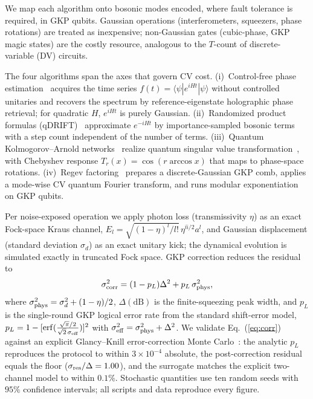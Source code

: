 \documentclass[10pt]{iopart}
\begin{document}
We map each algorithm onto bosonic modes encoded, where fault tolerance is
required, in GKP qubits. Gaussian operations (interferometers, squeezers, phase
rotations) are treated as inexpensive; non-Gaussian gates (cubic-phase, GKP
magic states) are the costly resource, analogous to the $T$-count of
discrete-variable (DV) circuits.

The four algorithms span the axes that govern CV cost. (i)~Control-free phase
estimation~\cite{Clinton2026} acquires the time series
$f(t)=\langle\psi|e^{iHt}|\psi\rangle$ without controlled unitaries and recovers
the spectrum by reference-eigenstate holographic phase retrieval; for quadratic
$H$, $e^{iHt}$ is purely Gaussian. (ii)~Randomized product formulas
(qDRIFT)~\cite{Campbell2019,Chen2021} approximate $e^{-iHt}$ by
importance-sampled bosonic terms with a step count independent of the number of
terms. (iii)~Quantum Kolmogorov--Arnold
networks~\cite{Ivashkov2024,Liu2024} realize quantum singular value
transformation~\cite{Low2017,Gilyen2019,Rossi2022}, with Chebyshev response
$T_r(x)=\cos(r\arccos x)$ that maps to phase-space rotations. (iv)~Regev factoring~\cite{Regev2023,Shor1997}
prepares a discrete-Gaussian GKP comb, applies a mode-wise CV quantum Fourier
transform, and runs modular exponentiation on GKP qubits.

Per noise-exposed operation we apply photon loss (transmissivity $\eta$) as an
exact Fock-space Kraus channel,
$E_l=\sqrt{(1-\eta)^l/l!}\,\eta^{\hat n/2}a^l$, and Gaussian displacement
(standard deviation $\sigma_d$) as an exact unitary kick; the dynamical
evolution is simulated exactly in truncated Fock space. GKP correction reduces
the residual to
\begin{equation}
\sigma_{\rm corr}^2=(1-p_L)\Delta^2+p_L\,\sigma_{\rm phys}^2,
\label{eq:corr}
\end{equation}
where $\sigma_{\rm phys}^2=\sigma_d^2+(1-\eta)/2$, $\Delta(\mathrm{dB})$ is the
finite-squeezing peak width, and $p_L$ is the single-round GKP logical error
rate from the standard shift-error model,
$p_L=1-[\mathrm{erf}(\frac{\sqrt\pi/2}{\sqrt2\,\sigma_{\rm eff}})]^{2}$ with
$\sigma_{\rm eff}^2=\sigma_{\rm phys}^2+\Delta^2$. We validate
Eq.~(\ref{eq:corr}) against an explicit Glancy--Knill error-correction Monte
Carlo~\cite{Glancy2006}: the analytic $p_L$ reproduces the protocol to within
$3\times10^{-4}$ absolute, the post-correction residual equals the floor
($\sigma_{\rm res}/\Delta=1.00$), and the surrogate matches the explicit
two-channel model to within $0.1\%$. Stochastic quantities use ten random seeds
with $95\%$ confidence intervals; all scripts and data reproduce every figure.
\end{document}
